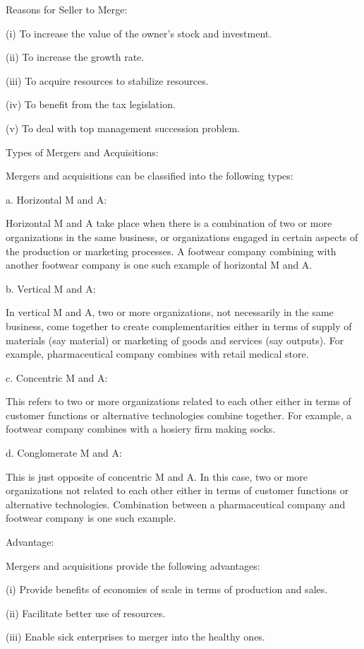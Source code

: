 \documentclass{article}
\begin{document}
Reasons for Seller to Merge:

(i) To increase the value of the owner’s stock and investment.

(ii) To increase the growth rate.

(iii) To acquire resources to stabilize resources.

(iv) To benefit from the tax legislation.

(v) To deal with top management succession problem.

Types of Mergers and Acquisitions:

Mergers and acquisitions can be classified into the following types:

a. Horizontal M and A:

Horizontal M and A take place when there is a combination of two or more organizations in the same business, 
or organizations engaged in certain aspects of the production or marketing processes. A footwear company combining 
with another footwear company is one such example of horizontal M and A.

b. Vertical M and A:

In vertical M and A, two or more organizations, not necessarily in the same business, come together to create 
complementarities either in terms of supply of materials (say material) or marketing of goods and services (say outputs).
 For example, pharmaceutical company combines with retail medical store.

c. Concentric M and A:

This refers to two or more organizations related to each other either in terms of customer functions or alternative technologies
 combine together. For example, a footwear company combines with a hosiery firm making socks.

d. Conglomerate M and A:

This is just opposite of concentric M and A. In this case, two or more organizations not related to each other either in 
terms of customer functions or alternative technologies. Combination between a pharmaceutical company and footwear company
 is one such example.

Advantage:

Mergers and acquisitions provide the following advantages:

(i) Provide benefits of economies of scale in terms of production and sales.

(ii) Facilitate better use of resources.

(iii) Enable sick enterprises to merger into the healthy ones.
\end{document}
